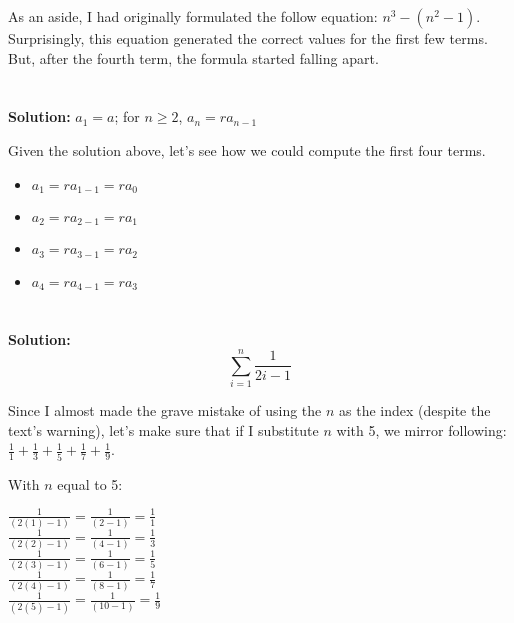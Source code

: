 \documentclass{article}
\begin{document}
As an aside, I had originally formulated the follow equation: $n^{3} - (n^{2} -1)$. Surprisingly, this equation generated the correct values for the first few terms. But, after the fourth term, the formula started falling apart.

\section{}

\textbf{Solution:} $a_1 = a$; for $n \ge 2$,  $a_n = ra_{n-1}$ 

Given the solution above, let's see how we could compute the first four terms.

\begin{itemize}
    \item $a_1 = ra_{1-1} = ra_{0}$
    \item $a_2 = ra_{2-1} = ra_{1}$
    \item $a_3 = ra_{3-1} = ra_{2}$
    \item $a_4 = ra_{4-1} = ra_{3}$
\end{itemize}


\section{}

\textbf{Solution: } $$\sum_{i=1}^{n} \frac{1}{2i - 1}$$

Since I almost made the grave mistake of using the $n$ as the index (despite the text's warning), let's make sure that if I substitute $n$ with 5, we mirror following: $\frac{1}{1} + \frac{1}{3} + \frac{1}{5} + \frac{1}{7} + \frac{1}{9}$.

With $n$ equal to 5:

$\frac{1}{(2(1) -1)} = \frac{1}{(2 - 1)} = \frac{1}{1}$ \\

$\frac{1}{(2(2) -1)} = \frac{1}{(4 - 1)} = \frac{1}{3}$\\

$\frac{1}{(2(3) -1)} = \frac{1}{(6 - 1)} = \frac{1}{5}$\\

$\frac{1}{(2(4) -1)} = \frac{1}{(8 - 1)} = \frac{1}{7}$\\

$\frac{1}{(2(5) -1)} = \frac{1}{(10 - 1)} = \frac{1}{9}$\\
\end{document}
